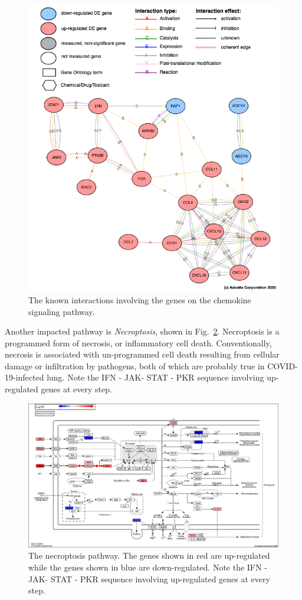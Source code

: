 \begin{figure}
\centering
	\includegraphics[width=0.8\linewidth]{Figures/chemokine_signaling_mechanism.png}
    \caption{The known interactions involving the genes on the chemokine signaling pathway. }
        \label{Supp:chemokine_signaling_mechanism}
\end{figure}

Another impacted pathway is \emph{Necroptosis}, shown in Fig.~\ref{Supp:necroptosis}. Necroptosis is a programmed form of necrosis, or inflammatory cell death. Conventionally, necrosis is associated with un-programmed cell death resulting from cellular damage or infiltration by pathogens, both of which are probably true in COVID-19-infected lung. Note the IFN - JAK- STAT - PKR  sequence involving up-regulated genes at every step. 

\begin{figure}
\centering
	\includegraphics[width=1\linewidth]{Figures/necroptosis.png}
    \caption{The necroptosis pathway. The genes shown in red are up-regulated while the genes shown in blue are down-regulated.  Note the IFN - JAK- STAT - PKR  sequence involving up-regulated genes at every step. }
        \label{Supp:necroptosis}
\end{figure}

